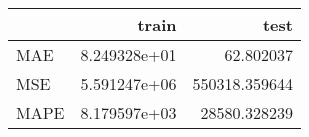 \begin{tabular}{lrr}
\toprule
{} &         train &           test \\
\midrule
MAE  &  8.249328e+01 &      62.802037 \\
MSE  &  5.591247e+06 &  550318.359644 \\
MAPE &  8.179597e+03 &   28580.328239 \\
\bottomrule
\end{tabular}
